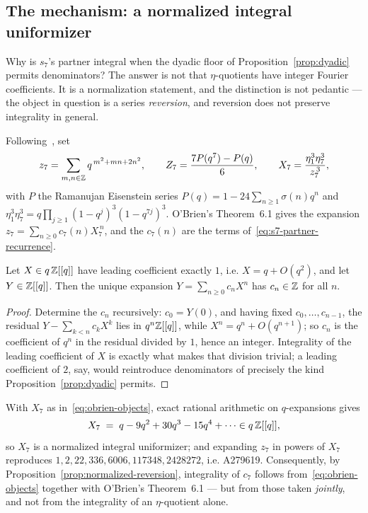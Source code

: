 \subsection{The mechanism: a normalized integral uniformizer}
\label{ssec:mechanism}

Why is $s_7$'s partner integral when the dyadic floor of
Proposition~\ref{prop:dyadic} permits denominators? The answer is not that
$\eta$-quotients have integer Fourier coefficients. It is a normalization
statement, and the distinction is not pedantic --- the object in question is a
series \emph{reversion}, and reversion does not preserve integrality in
general.

Following~\cite{OBrien2016}, set
\begin{equation}\label{eq:obrien-objects}
  z_7 = \sum_{m,n\in\mathbb{Z}}q^{\,m^2+mn+2n^2}, \qquad
  Z_7 = \frac{7P(q^7)-P(q)}{6}, \qquad
  X_7 = \frac{\eta_1^3\eta_7^3}{z_7^{\,3}},
\end{equation}
with $P$ the Ramanujan Eisenstein series $P(q) = 1-24\sum_{n\geq1}\sigma(n)q^n$
and $\eta_1^3\eta_7^3 = q\prod_{j\geq1}(1-q^j)^3(1-q^{7j})^3$. O'Brien's
Theorem~6.1 gives the expansion $z_7 = \sum_{n\geq0}c_7(n)X_7^{\,n}$, and the
$c_7(n)$ are the terms of~\eqref{eq:s7-partner-recurrence}.

\begin{proposition}
\label{prop:normalized-reversion}
Let $X \in q\,\mathbb{Z}[[q]]$ have leading coefficient exactly $1$, i.e.
$X = q + O(q^2)$, and let $Y \in \mathbb{Z}[[q]]$. Then the unique expansion
$Y = \sum_{n\geq0}c_nX^n$ has $c_n \in \mathbb{Z}$ for all $n$.
\end{proposition}

\begin{proof}
Determine the $c_n$ recursively: $c_0 = Y(0)$, and having fixed
$c_0,\dots,c_{n-1}$, the residual $Y - \sum_{k<n}c_kX^k$ lies in
$q^n\mathbb{Z}[[q]]$, while $X^n = q^n + O(q^{n+1})$; so $c_n$ is the coefficient of
$q^n$ in the residual divided by $1$, hence an integer. Integrality of the
leading coefficient of $X$ is exactly what makes that division trivial; a
leading coefficient of $2$, say, would reintroduce denominators of precisely
the kind Proposition~\ref{prop:dyadic} permits.
\end{proof}

\begin{proposition}\label{prop:mechanism}
With $X_7$ as in~\eqref{eq:obrien-objects}, exact rational arithmetic on
$q$-expansions gives
\[
  X_7 \;=\; q - 9q^2 + 30q^3 - 15q^4 + \cdots \in q\,\mathbb{Z}[[q]],
\]
so $X_7$ is a normalized integral uniformizer; and expanding $z_7$ in powers
of $X_7$ reproduces $1,2,22,336,6006,117348,2428272$, i.e. A279619.
Consequently, by Proposition~\ref{prop:normalized-reversion}, integrality of
$c_7$ follows from~\eqref{eq:obrien-objects} together with O'Brien's
Theorem~6.1 --- but from those taken \emph{jointly}, and not from the
integrality of an $\eta$-quotient alone.
\end{proposition}

